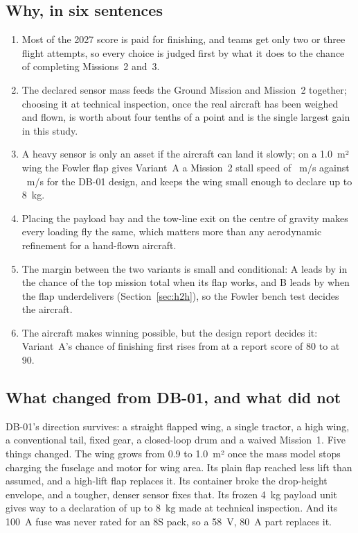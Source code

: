 \subsection{Why, in six sentences}
\begin{enumerate}
\item Most of the 2027 score is paid for finishing, and teams get only two or three flight attempts, so every choice is judged first by what it does to the chance of completing Missions~2 and~3.
\item The declared sensor mass feeds the Ground Mission and Mission~2 together; choosing it at technical inspection, once the real aircraft has been weighed and flown, is worth about four tenths of a point and is the single largest gain in this study.
\item A heavy sensor is only an asset if the aircraft can land it slowly; on a 1.0~m² wing the Fowler flap gives Variant~A a Mission~2 stall speed of ~m/s against ~m/s for the DB-01 design, and keeps the wing small enough to declare up to 8~kg.
\item Placing the payload bay and the tow-line exit on the centre of gravity makes every loading fly the same, which matters more than any aerodynamic refinement for a hand-flown aircraft.
\item The margin between the two variants is small and conditional: A leads by  in the chance of the top mission total when its flap works, and B leads by  when the flap underdelivers (Section~\ref{sec:h2h}), so the Fowler bench test decides the aircraft.
\item The aircraft makes winning possible, but the design report decides it: Variant~A's chance of finishing first rises from  at a report score of 80 to  at 90.
\end{enumerate}

\subsection{What changed from DB-01, and what did not}
DB-01's direction survives: a straight flapped wing, a single tractor, a high wing, a conventional tail, fixed gear, a closed-loop drum and a waived Mission~1. Five things changed. The wing grows from 0.9 to 1.0~m² once the mass model stops charging the fuselage and motor for wing area. Its plain flap reached less lift than assumed, and a high-lift flap replaces it. Its container broke the drop-height envelope, and a tougher, denser sensor fixes that. Its frozen 4~kg payload unit gives way to a declaration of up to 8~kg made at technical inspection. And its 100~A fuse was never rated for an 8S pack, so a 58~V, 80~A part replaces it.

